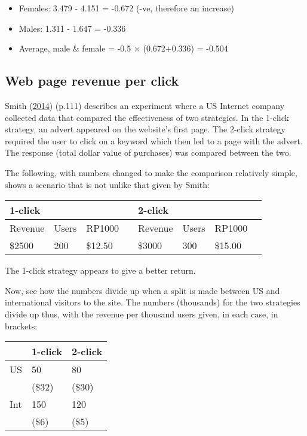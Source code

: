 \documentclass[
  10ptls,
  b5paper]{book}
\providecommand{\tightlist}{%
  \setlength{\itemsep}{0pt}\setlength{\parskip}{0pt}}
\begin{document}
\begin{itemize}
\tightlist
\item
  Females: 3.479 - 4.151 = -0.672 (-ve, therefore an increase)
\item
  Males: 1.311 - 1.647 = -0.336
\item
  Average, male \& female = -0.5 \(\times\) (0.672+0.336) = -0.504
\end{itemize}

\hypertarget{web-page-revenue-per-click}{%
\subsection*{Web page revenue per click}\label{web-page-revenue-per-click}}

Smith (\protect\hyperlink{ref-smith-sd}{2014}) (p.111) describes an experiment where a US Internet company collected data that compared the effectiveness of two strategies. In the 1-click strategy, an advert appeared on the website's first page. The 2-click strategy required the user to click on a keyword which then led to a page with the advert. The response (total dollar value of purchases) was compared between the two.

The following, with numbers changed to make the comparison relatively simple, shows a scenario that is not unlike that given by Smith:

\begin{longtable}[]{@{}llllllll@{}}
\toprule\noalign{}
1-click & & & & 2-click & & & \\
\midrule\noalign{}
\endhead
\bottomrule\noalign{}
\endlastfoot
Revenue & Users & RP1000 & & Revenue & Users & RP1000 & \\
\$2500 & 200 & \$12.50 & & \$3000 & 300 & \$15.00 & \\
\end{longtable}

The 1-click strategy appears to give a better return.

Now, see how the numbers divide up when a split is made between US and international visitors to the site. The numbers (thousands) for the two strategies divide up thus, with the revenue per thousand users given, in each case, in brackets:

\begin{longtable}[]{@{}lll@{}}
\toprule\noalign{}
& 1-click & 2-click \\
\midrule\noalign{}
\endhead
\bottomrule\noalign{}
\endlastfoot
US & 50 & 80 \\
& (\$32) & (\$30) \\
Int & 150 & 120 \\
& (\$6) & (\$5) \\
\end{longtable}
\end{document}

